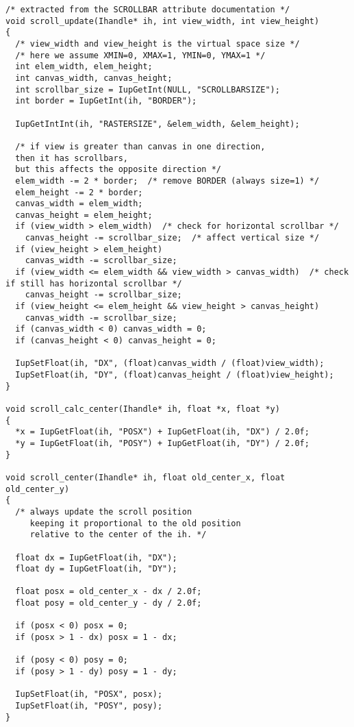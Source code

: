 \documentclass{ctexart}
\begin{document}
\begin{lstlisting}
/* extracted from the SCROLLBAR attribute documentation */
void scroll_update(Ihandle* ih, int view_width, int view_height)
{
  /* view_width and view_height is the virtual space size */
  /* here we assume XMIN=0, XMAX=1, YMIN=0, YMAX=1 */
  int elem_width, elem_height;
  int canvas_width, canvas_height;
  int scrollbar_size = IupGetInt(NULL, "SCROLLBARSIZE");
  int border = IupGetInt(ih, "BORDER");

  IupGetIntInt(ih, "RASTERSIZE", &elem_width, &elem_height);

  /* if view is greater than canvas in one direction,
  then it has scrollbars,
  but this affects the opposite direction */
  elem_width -= 2 * border;  /* remove BORDER (always size=1) */
  elem_height -= 2 * border;
  canvas_width = elem_width;
  canvas_height = elem_height;
  if (view_width > elem_width)  /* check for horizontal scrollbar */
    canvas_height -= scrollbar_size;  /* affect vertical size */
  if (view_height > elem_height)
    canvas_width -= scrollbar_size;
  if (view_width <= elem_width && view_width > canvas_width)  /* check if still has horizontal scrollbar */
    canvas_height -= scrollbar_size;
  if (view_height <= elem_height && view_height > canvas_height)
    canvas_width -= scrollbar_size;
  if (canvas_width < 0) canvas_width = 0;
  if (canvas_height < 0) canvas_height = 0;

  IupSetFloat(ih, "DX", (float)canvas_width / (float)view_width);
  IupSetFloat(ih, "DY", (float)canvas_height / (float)view_height);
}

void scroll_calc_center(Ihandle* ih, float *x, float *y)
{
  *x = IupGetFloat(ih, "POSX") + IupGetFloat(ih, "DX") / 2.0f;
  *y = IupGetFloat(ih, "POSY") + IupGetFloat(ih, "DY") / 2.0f;
}

void scroll_center(Ihandle* ih, float old_center_x, float old_center_y)
{
  /* always update the scroll position
     keeping it proportional to the old position
     relative to the center of the ih. */

  float dx = IupGetFloat(ih, "DX");
  float dy = IupGetFloat(ih, "DY");

  float posx = old_center_x - dx / 2.0f;
  float posy = old_center_y - dy / 2.0f;

  if (posx < 0) posx = 0;
  if (posx > 1 - dx) posx = 1 - dx;

  if (posy < 0) posy = 0;
  if (posy > 1 - dy) posy = 1 - dy;

  IupSetFloat(ih, "POSX", posx);
  IupSetFloat(ih, "POSY", posy);
}


\end{lstlisting}
\end{document}
